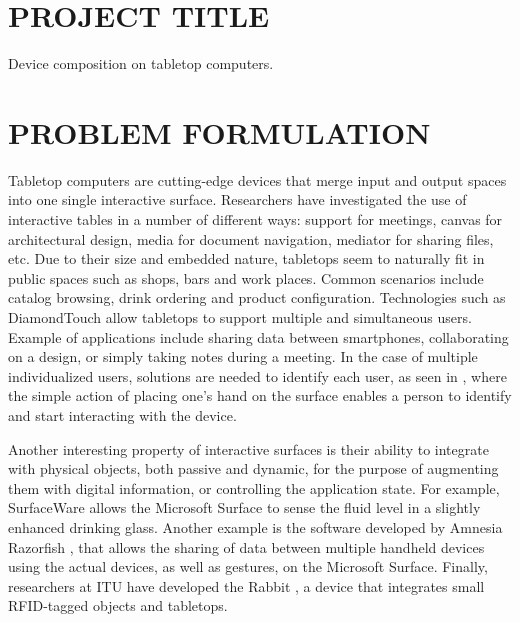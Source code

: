 \section{PROJECT TITLE}

Device composition on tabletop computers.

\section{PROBLEM FORMULATION}

Tabletop computers are cutting-edge devices that merge input and output spaces into one single interactive surface.
Researchers have investigated the use of interactive tables in a number of different ways: support for meetings, canvas for architectural design, media for document navigation, mediator for sharing files, etc.
Due to their size and embedded nature, tabletops seem to naturally fit in public spaces such as shops, bars and work places.
Common scenarios include catalog browsing, drink ordering and product configuration.
Technologies such as DiamondTouch \cite{Dietz:2001:diamondtouch} allow tabletops to support multiple and simultaneous users. Example of applications include sharing data between smartphones, collaborating on a design, or simply taking notes during a meeting.
In the case of multiple individualized users, solutions are needed to identify each user, as seen in \cite{Schmidt:2010:handsdown}, where the simple action of placing one's hand on the surface enables a person to identify and start interacting with the device.

Another interesting property of interactive surfaces is their ability to integrate with physical objects, both passive and dynamic, for the purpose of augmenting them with digital information, or controlling the application state.
For example, SurfaceWare \cite{Dietz:2009:surfaceware} allows the Microsoft Surface to sense the fluid level in a slightly enhanced drinking glass.
Another example is the software developed by Amnesia Razorfish \cite{amnesia}, that allows the sharing of data between multiple handheld devices using the actual devices, as well as gestures, on the Microsoft Surface.
Finally, researchers at ITU have developed the Rabbit \cite{rabbit}, a device that integrates small RFID-tagged objects and tabletops.


